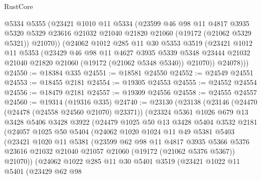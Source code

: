 \begin{lexlean}{RustCore}
\begin{coremodule}
        @5334
        @5355
        (@23421
          @1010
          @11
          @5334
          (@23599
            @46
            @98
            @11
            @4817
            @3935
            @5320
            @5329
            @23616
            @21032
            @21040
            @21820
            @21060
            (@19172 (@21062 @5329 @5321))
            @21070))
        (@24062
          @1012
          @285
          @11
          @30
          @5353
          @3519
          (@23421
            @1012
            @11
            @5353
            (@23429
              @46
              @98
              @11
              @4627
              @3935
              @5339
              @5348
              @23444
              @21032
              @21040
              @21820
              @21060
              (@19172 (@21062 @5348 @5340))
              @21070))
          @24078)))
@24550 := @18384 @335
@24551 := @18581 @24550
@24552 := @24549 @24551
@24553 := @18455 @2181
@24554 := @19305 @24553
@24555 := @24552 @24554
@24556 := @18479 @2181
@24557 := @19309 @24556
@24558 := @24555 @24557
@24560 := @19314 (@19316 @335)
@24740 := @23130
    (@23138
      (@23146
        (@24470 (@24478 (@24558 @24560 @21070) @23371))
        (@23324
          @5361
          @1026
          @679
          @13
          @3428
          @5406
          @3428
          @3922
          (@24479
            @1025
            @50
            @13
            @3428
            @5404
            @3532
            @2181
            (@24057
              @1025
              @50
              @5404
              (@24062
                @1020
                @1024
                @11
                @49
                @5381
                @5403
                (@23421
                  @1020
                  @11
                  @5381
                  (@23599
                    @62
                    @98
                    @11
                    @4817
                    @3935
                    @5366
                    @5376
                    @23616
                    @21032
                    @21040
                    @21057
                    @21060
                    (@19172 (@21062 @5376 @5367))
                    @21070))
                (@24062
                  @1022
                  @285
                  @11
                  @30
                  @5401
                  @3519
                  (@23421
                    @1022
                    @11
                    @5401
                    (@23429
                      @62
                      @98

\end{coremodule}
\end{lexlean}
